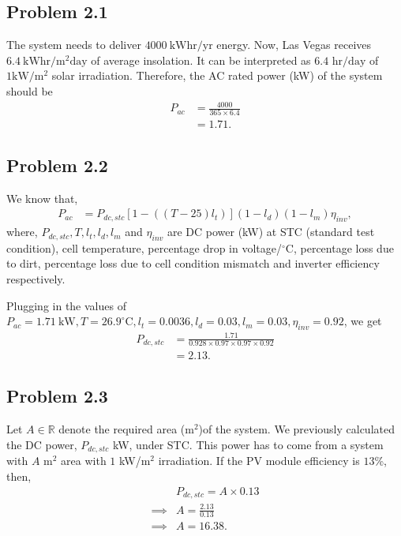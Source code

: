 \subsection*{Problem 2.1}
The system needs to deliver $4000\ \text{kWhr}/\text{yr}$ energy. Now, Las Vegas receives $6.4\ \text{kWhr}/\text{m}^2\text{day}$ of average insolation. It can be interpreted as $6.4 \text{ hr/day}$ of $1 \text{kW}/\text{m}^2$ solar irradiation. Therefore, the AC rated power (kW) of the system should be
\begin{align*}
	P_{ac} &= \frac{4000}{365\times 6.4}\\
	&= 1.71.
\end{align*}
\subsection*{Problem 2.2}
We know that,
\begin{align}
	P_{ac} &= P_{dc,stc}\left[1-((T-25)l_{t})\right](1-l_{d})(1-l_{m})\eta_{inv},
\end{align}
where, $P_{dc,stc}, T, l_{t}, l_{d}, l_{m}$ and $\eta_{inv}$ are DC power (kW) at STC (standard test condition), cell temperature, percentage drop in voltage/$^{\circ}$C, percentage loss due to dirt, percentage loss due to cell condition mismatch and inverter efficiency respectively.

Plugging in the values of $P_{ac}=1.71\ \text{kW}, T=26.9^{\circ}\text{C}, l_t = 0.0036, l_d=0.03, l_m=0.03, \eta_{inv}=0.92$, we get
\begin{align*}
	P_{dc,stc} &= \frac{1.71}{0.928\times 0.97 \times 0.97\times 0.92}\\
	&= 2.13.
\end{align*}
\subsection*{Problem 2.3}
Let $A\in \mathbb{R}$ denote the required area (m$^2$)of the system. We previously calculated the DC power, $P_{dc,stc}$ kW, under STC. This power has to come from a system with $A$ m$^2$ area with $1$ kW/m$^2$ irradiation. If the PV module efficiency is $13$\%, then,
\begin{align*}
	&P_{dc,stc} = A\times 0.13\\
	\implies & A = \frac{2.13}{0.13}\\
	\implies & A = 16.38.
\end{align*}
